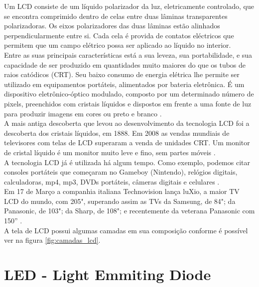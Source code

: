 Um LCD consiste de um líquido polarizador da luz, eletricamente controlado, que se encontra comprimido dentro de celas entre duas lâminas transparentes polarizadoras. Os eixos polarizadores das duas lâminas estão alinhados perpendicularmente entre si. Cada cela é provida de contatos eléctricos que permitem que um campo elétrico possa ser aplicado ao líquido no interior.\\

Entre as suas principais características está a sua leveza, sua portabilidade, e sua capacidade de ser produzido em quantidades muito maiores do que os tubos de raios catódicos (CRT). Seu baixo consumo de energia elétrica lhe permite ser utilizado em equipamentos portáteis, alimentados por bateria eletrônica. É um dispositivo eletrônico-óptico modulado, composto por um determinado número de pixels, preenchidos com cristais líquidos e dispostos em frente a uma fonte de luz para produzir imagens em cores ou preto e branco \cite{WikipediaLCD}.\\

A mais antiga descoberta que levou ao desenvolvimento da tecnologia LCD foi a descoberta dos cristais líquidos, em 1888. Em 2008 as vendas mundiais de televisores com telas de LCD superaram a venda de unidades CRT. Um monitor de cristal líquido é um monitor muito leve e fino, sem partes móveis \cite{WikipediaLCD}.\\

A tecnologia LCD já é utilizada há algum tempo. Como exemplo, podemos citar consoles portáteis que começaram no Gameboy (Nintendo), relógios digitais, calculadoras, mp4, mp3, DVDs portáteis, câmeras digitais e celulares \cite{WikipediaLCD}.\\

Em 17 de Março a companhia italiana Technovision lança luXio, a maior TV LCD do mundo, com 205", superando assim as TVs da Samsung, de 84"; da Panasonic, de 103"; da Sharp, de 108"; e recentemente da veterana Panasonic com 150'' \cite{WikipediaLCD}. \\

A tela de LCD possui algumas camadas em sua composição conforme é possível ver na figura \ref{fig:camadas_lcd}.\\


\section{LED - Light Emmiting Diode}
\label{sec:led}

